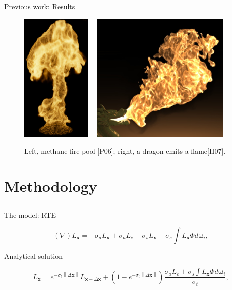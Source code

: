 \documentclass{beamer}
\newcommand{\x}{\mathbf{x}}
\newcommand{\omegam}{\boldsymbol{\omega}}
\newcommand{\deltax}{\left \|  \Delta \x \right \|}
\begin{document}
\begin{frame}{Previous work: Results}

\begin{figure}[t!]
\begin{center}
\includegraphics[width=0.3\textwidth]{img/pegoraro_2006} 
~
\includegraphics[width=0.59\textwidth]{img/hong_2007}
\caption*{\tiny{Left, methane fire pool [P06]; right, a dragon emits a flame[H07].}}
\end{center}
\end{figure}

\end{frame}

\section{Methodology}
\subsection{ }

\begin{frame}{The model: RTE}

\begin{equation*}
(\nabla) L_{\x} = - \sigma_a L_{\x} + \sigma_a L_e - \sigma_s L_{\x} + \sigma_s \int L_{\x} \Phi d \omegam_i,
\end{equation*}

Analytical solution

\begin{equation*}
L_{\x} = e^{-\sigma_t \deltax} L_{\x + \Delta\x} + 
 \left(1 - e^{-\sigma_t \deltax} \right) \frac{\sigma_a L_e + \sigma_s \int L_{\x} \Phi d \omegam_i}{\sigma_t},
\end{equation*}

\end{frame}
\end{document}
